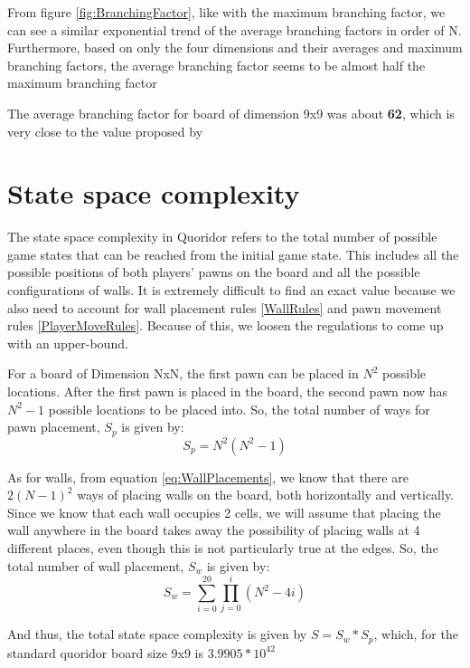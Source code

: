 From figure \ref{fig:BranchingFactor}, like with the maximum branching factor, we can see a similar exponential trend of the average branching factors in order of N. Furthermore, based on only the four dimensions and their averages and maximum branching factors, the average branching factor seems to be almost half the maximum branching factor

The average branching factor for board of dimension 9x9 was about \textbf{62}, which is very close to the value proposed by \cite{Glendenning2002MasteringQ}

\section{State space complexity}

The state space complexity in Quoridor refers to the total number of possible game states that can be reached from the initial game state. This includes all the possible positions of both players' pawns on the board and all the possible configurations of walls.
It is extremely difficult to find an exact value because we also need to account for wall placement rules \ref{WallRules} and pawn movement rules \ref{PlayerMoveRules}.
Because of this, we loosen the regulations to come up with an upper-bound.

For a board of Dimension NxN, the first pawn can be placed in $N^2$ possible locations. After the first pawn is placed in the board, the second pawn now has $N^2-1$ possible locations to be placed into. So, the total number of ways for pawn placement, $S_p$ is given by: \cite{Mertens2006Quoridor}
\begin{equation}
    S_p = N^2(N^2 - 1)
\end{equation}

As for walls, from equation \ref{eq:WallPlacements}, we know that there are $2(N-1)^2$ ways of placing walls on the board, both horizontally and vertically. Since we know that each wall occupies 2 cells, we will assume that placing the wall anywhere in the board takes away the possibility of placing walls at 4 different places, even though this is not particularly true at the edges. So, the total number of wall placement, $S_w$ is given by: \cite{Mertens2006Quoridor}
\begin{equation}
    S_w = \sum_{i=0}^{20}\prod_{j=0}^{i}(N^2 - 4i)
\end{equation}

And thus, the total state space complexity is given by $S = S_w * S_p$, which, for the standard quoridor board size 9x9 is \textbf{$3.9905 * 10^{42}$} \cite{Mertens2006Quoridor}

